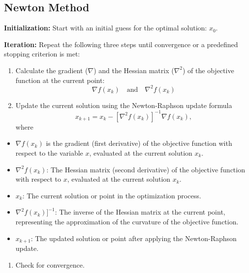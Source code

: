 \documentclass[
  letterpaper,
  DIV=11,
  numbers=noendperiod]{scrreprt}
\providecommand{\tightlist}{%
  \setlength{\itemsep}{0pt}\setlength{\parskip}{0pt}}\usepackage{longtable,booktabs,array}
\begin{document}
\subsection{Newton Method}\label{newton-method}

\textbf{Initialization:} Start with an initial guess for the optimal
solution: \(x_0\).

\textbf{Iteration:} Repeat the following three steps until convergence
or a predefined stopping criterion is met:

\begin{enumerate}
\def\labelenumi{\arabic{enumi})}
\item
  Calculate the gradient (\(\nabla\)) and the Hessian matrix
  (\(\nabla^2\)) of the objective function at the current point:
  \[\nabla f(x_k) \quad \text{and} \quad \nabla^2 f(x_k)\]
\item
  Update the current solution using the Newton-Raphson update formula
  \[x_{k+1} = x_k - [\nabla^2 f(x_k)]^{-1} \nabla f(x_k),\] where
\end{enumerate}

\begin{itemize}
\tightlist
\item
  \(\nabla f(x_k)\) is the gradient (first derivative) of the objective
  function with respect to the variable \(x\), evaluated at the current
  solution \(x_k\).
\item
  \(\nabla^2 f(x_k)\): The Hessian matrix (second derivative) of the
  objective function with respect to \(x\), evaluated at the current
  solution \(x_k\).
\item
  \(x_k\): The current solution or point in the optimization process.
\item
  \(\nabla^2 f(x_k)]^{-1}\): The inverse of the Hessian matrix at the
  current point, representing the approximation of the curvature of the
  objective function.
\item
  \(x_{k+1}\): The updated solution or point after applying the
  Newton-Raphson update.
\end{itemize}

\begin{enumerate}
\def\labelenumi{\arabic{enumi})}
\setcounter{enumi}{2}
\tightlist
\item
  Check for convergence.
\end{enumerate}
\end{document}
